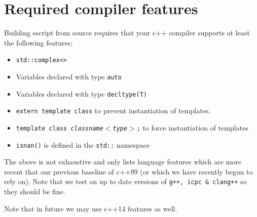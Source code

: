 \chapter{Required compiler features}
\label{app:cxxfeatures}

Building escript from source requires that your c++ compiler supports at least the following features:
\begin{itemize}
 \item \texttt{std::complex<>}
 \item Variables declared with type \texttt{auto}
 \item Variables declared with type \texttt{decltype(T)}
 \item \texttt{extern template class} to prevent instantiation of templates. 
 \item \texttt{template class \textit{classname$<$type$>$};} to force instantiation of templates
 \item \texttt{isnan()} is defined in the \texttt{std::} namespace
\end{itemize}
The above is not exhaustive and only lists language features which are more recent that our previous baseline of c++99 (or which
we have recently begun to rely on).
Note that we test on up to date versions of \texttt{g++, icpc \& clang++} so they should be fine.

Note that in future we may use c++14 features as well.
